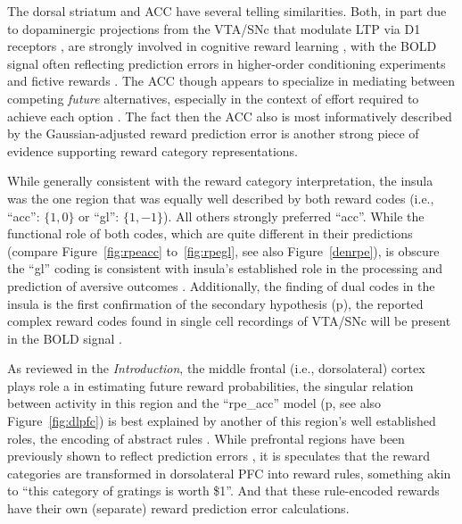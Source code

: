 The dorsal striatum and ACC have several telling similarities.  Both, in part due to dopaminergic projections from the VTA/SNc that modulate LTP via D1 receptors \cite{Schweimer:2006p9780}, are strongly involved in cognitive reward learning \cite{Atlas:2010p7566,Hayden:2009p6545,Rudebeck:2008p4712,Rolls:2008p7577,Quilodran:2008p2645,Hampton:2007p2983,Ernst:2004p3998}, with the BOLD signal often reflecting prediction errors in higher-order conditioning experiments \cite{seymour:2004aa} and fictive rewards \cite{Hayden:2009p6545}.  The ACC though appears to specialize in mediating between competing \emph{future} alternatives, especially in the context of effort required to achieve each option \cite{Quilodran:2008p2645}.  The fact then the ACC also is most informatively described by the Gaussian-adjusted reward prediction error is another strong piece of evidence supporting reward category representations.  

While generally consistent with the reward category interpretation, the insula was the one region that was equally well described by both reward codes (i.e., ``acc'': $\{1,0\}$ or ``gl'': $\{1,-1\}$).  All others strongly preferred ``acc''.  While the functional role of both codes, which are quite different in their predictions (compare Figure~\ref{fig:rpeacc} to~\ref{fig:rpegl}, see also Figure~\ref{denrpe}), is obscure the ``gl'' coding is consistent with insula's established role in the processing and prediction of aversive outcomes \cite{Chua:1999p9833,Phillips:1998p9834,Buchel:1998p9836,Elliott:2000p1637}.  Additionally, the finding of dual codes in the insula is the first confirmation of the secondary hypothesis (p\pageref{subsub:codesandfits}), the reported complex reward codes found in single cell recordings of VTA/SNc will be present in the BOLD signal \cite{Kim:2006p1063,Matsumoto:2009p7219,Smith:2011p8133}.

As reviewed in the \emph{Introduction}, the middle frontal (i.e., dorsolateral) cortex plays role a in estimating future reward probabilities, the singular relation between activity in this region and the ``rpe\_acc'' model (p\pageref{subsub:onsheet}, see also Figure~\ref{fig:dlpfc}) is best explained by another of this region's well established roles, the encoding of abstract rules \cite{Wallis:2001p8129}.  While prefrontal regions have been previously shown to reflect prediction errors \cite{Ramnani:2004p5390}, it is speculates that the reward categories are transformed in dorsolateral PFC into reward rules, something akin to ``this category of gratings is worth \$1''.  And that these rule-encoded rewards have their own (separate) reward prediction error calculations.

